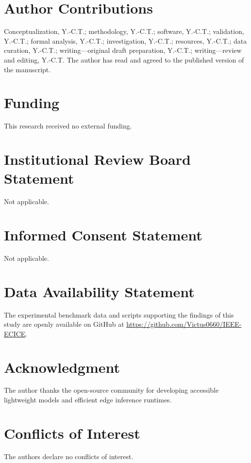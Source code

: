 \documentclass[conference]{IEEEtran}
\begin{document}
\section*{Author Contributions}
Conceptualization, Y.-C.T.; methodology, Y.-C.T.; software, Y.-C.T.; validation, Y.-C.T.; formal analysis, Y.-C.T.; investigation, Y.-C.T.; resources, Y.-C.T.; data curation, Y.-C.T.; writing---original draft preparation, Y.-C.T.; writing---review and editing, Y.-C.T. The author has read and agreed to the published version of the manuscript.

\section*{Funding}
This research received no external funding.

\section*{Institutional Review Board Statement}
Not applicable.

\section*{Informed Consent Statement}
Not applicable.

\section*{Data Availability Statement}
The experimental benchmark data and scripts supporting the findings of this study are openly available on GitHub at \url{https://github.com/Victus0660/IEEE-ECICE}.

\section*{Acknowledgment}
The author thanks the open-source community for developing accessible lightweight models and efficient edge inference runtimes.

\section*{Conflicts of Interest}
The authors declare no conflicts of interest.



\end{document}
